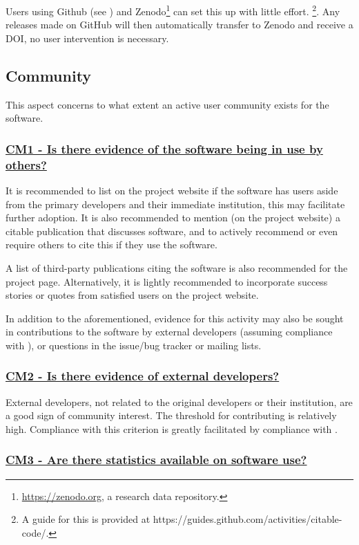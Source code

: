 \documentclass[a4paper,11pt]{article}
\newcommand{\criterion}[2]{\subsubsection*{\underline{#1 - #2}}\label{id:#1}}
\newcommand\CheckTable{%
  \begin{tabular}{ccccc}
    No & Minimal & Adequate & Good & Perfect \\
    0 & 1 & 2 & 3 & 4 \\
    \hline
    $\square$ & $\square$ & $\square$ & $\square$ & $\square$ \\
  \end{tabular}%
}
\newcommand{\refcrit}[1]{%
 \framebox[1.1\width]{\hyperref[id:#1]{#1}}
}
\begin{document}
Users using Github (see \refcrit{AC2}) and Zenodo\footnote{\url{https://zenodo.org}, a
research data repository.} can set this up with little effort. \footnote{A guide
for this is provided at https://guides.github.com/activities/citable-code/.}.
Any releases made on GitHub will then automatically transfer to Zenodo and
receive a DOI, no user intervention is necessary. 


\subsection{Community}\label{sec:com}

This aspect concerns to what extent an active user community exists for the
software.

\newcommand{\cmOneID}{CM1}
\newcommand{\cmOneText}{Is there evidence of the software being in use by others?}
\criterion{\cmOneID}{\cmOneText}

It is recommended to list on the project website if the software has 
users aside from the primary developers and their immediate institution, this
may facilitate further adoption. It is also recommended to mention (on the
project website) a citable publication that discusses software, and to actively
recommend or even require others to cite this if they use the software.

A list of third-party publications citing the software is also recommended for
the project page. Alternatively, it is lightly recommended to
incorporate success stories or quotes from satisfied users on the project
website.

In addition to the aforementioned, evidence for this activity may also be sought
in contributions to the software by external developers (assuming
compliance with \refcrit{AC2}), or questions in the issue/bug tracker or mailing lists.


\newcommand{\cmTwoID}{CM2}
\newcommand{\cmTwoText}{Is there evidence of external developers?}
\criterion{\cmTwoID}{\cmTwoText}

External developers, not related to the original developers or their
institution, are a good sign of community interest. The threshold for
contributing is relatively high. Compliance with this criterion is greatly
facilitated by compliance with \refcrit{AC2}.


\newcommand{\cmThreeID}{CM3}
\newcommand{\cmThreeText}{Are there statistics available on software use?}
\criterion{\cmThreeID}{\cmThreeText}
\end{document}
